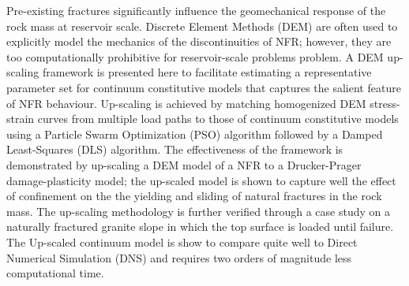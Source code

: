 Pre-existing fractures significantly influence the geomechanical response of the rock mass at reservoir scale.  Discrete Element Methods (DEM) are often used to explicitly model the mechanics of the discontinuities of NFR; however, they are too computationally prohibitive for reservoir-scale problems problem.
A DEM up-scaling framework is presented here to facilitate estimating a representative parameter set for continuum constitutive models that captures the salient feature of NFR behaviour. Up-scaling is achieved by matching homogenized DEM stress-strain curves from multiple load paths to those of continuum constitutive models using a Particle Swarm Optimization (PSO) algorithm followed by a Damped Least-Squares (DLS) algorithm. The effectiveness of the framework is demonstrated by up-scaling a DEM model of a NFR to a Drucker-Prager damage-plasticity model; the up-scaled model is shown to capture well the effect of confinement on the the yielding and sliding of natural fractures in the rock mass. The up-scaling methodology is further verified through a case study on a naturally fractured granite slope in which the top surface is loaded until failure. The Up-scaled continuum model is show to compare quite well to Direct Numerical Simulation (DNS) and requires two orders of magnitude less computational time.